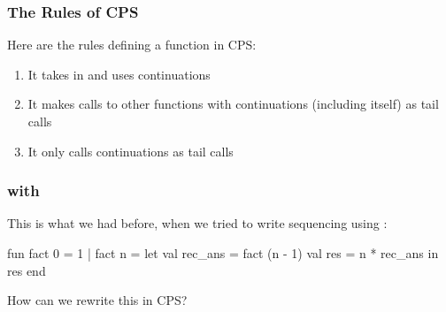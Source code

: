 \documentclass[aspectratio=169, handout]{beamer}
\begin{document}
\begin{frame}[fragile]
  \frametitle{The Rules of CPS}

  Here are the rules defining a function in CPS:

  \pause
  \vspace{\fill}


  \pause
  \vspace{\fill}

  \begin{enumerate}
    \item It takes in and uses continuations \pause
    \item It makes calls to other functions with continuations (including itself)
    as tail calls \pause
    \item It only calls continuations as tail calls
  \end{enumerate}

  \pause
  \vspace{\fill}

\end{frame}





\begin{frame}[fragile]
  \frametitle{ with }

  This is what we had before, when we tried to write sequencing using :

  \pause
  \vspace{\fill}

  \begin{codeblock}
    fun fact 0 = 1
      | fact n =
        let
          val rec_ans = fact (n - 1)
          val res = n * rec_ans
        in
          res
        end
  \end{codeblock}

  \pause
  \vspace{\fill}

  How can we rewrite this in CPS?
\end{frame}
\end{document}
